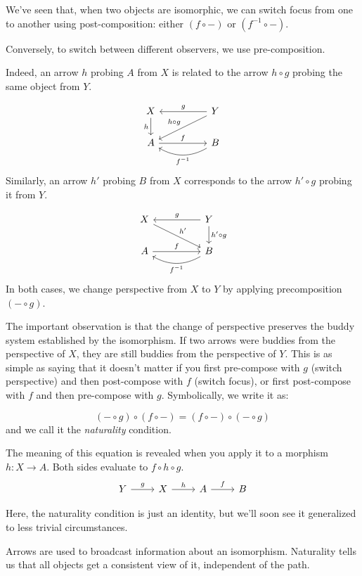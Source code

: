 \documentclass[DaoFP]{subfiles}
\begin{document}
We've seen that, when two objects are isomorphic, we can switch focus from one to another using post-composition: either $(f \circ -)$ or $(f^{-1} \circ -)$. 

Conversely, to switch between different observers, we use pre-composition. 

Indeed, an arrow $h$ probing $A$ from $X$ is related to the arrow $h\circ g$ probing the same object from $Y$.

\[
 \begin{tikzcd}
 X
 \arrow[d, "h"']
 && Y
 \arrow[ll, "g"']
  \arrow[dll, "h \circ g"']
 \\
 A
 \arrow[rr, "f"]
  && B
 \arrow[ll, bend left,  "f^{-1}"]
 \end{tikzcd}
\]
Similarly, an arrow $h'$ probing $B$ from $X$ corresponds to the arrow $h' \circ g$ probing it from $Y$. 

\[
 \begin{tikzcd}
 X
 \arrow[drr, "h'"]
 && Y
 \arrow[ll, "g"']
  \arrow[d, "h' \circ g"]
 \\
 A
 \arrow[rr, "f"]
  && B
 \arrow[ll, bend left,  "f^{-1}"]
 \end{tikzcd}
\]
In both cases, we change perspective from $X$ to $Y$ by applying precomposition $(- \circ g)$.

The important observation is that the change of perspective preserves the buddy system established by the isomorphism. If two arrows were buddies from the perspective of $X$, they are still buddies from the perspective of $Y$. This is as simple as saying that it doesn't matter if you first pre-compose with $g$ (switch perspective) and then post-compose with $f$ (switch focus), or first post-compose with $f$ and then pre-compose with $g$. Symbolically, we write it as:

\[(- \circ g) \circ (f \circ -) = (f \circ -) \circ (- \circ g)\]
and we call it the \emph{naturality} condition.

The meaning of this equation is revealed when you apply it to a morphism $h \colon X \to A$. Both sides evaluate to $f \circ h \circ g$.  \[
 \begin{tikzcd}
 Y \arrow[r, "g"] &X \arrow[r, "h"] & A \arrow[r, "f"] & B
\end{tikzcd}
\]

Here, the naturality condition is just an identity, but we'll soon see it generalized to less trivial circumstances.


Arrows are used to broadcast information about an isomorphism. Naturality tells us that all objects get a consistent view of it, independent of the path. 
\end{document}
